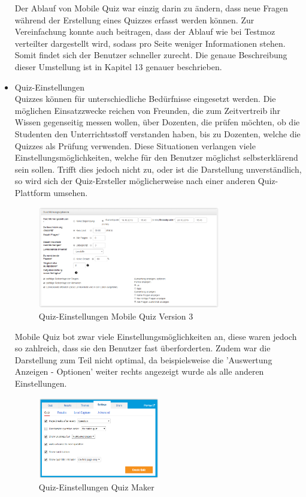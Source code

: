 \begin{itemize}
		Der Ablauf von Mobile Quiz war einzig darin zu ändern, dass neue Fragen während der Erstellung eines Quizzes erfasst werden können. Zur Vereinfachung konnte auch beitragen, dass der Ablauf wie bei Testmoz \cite{testmoz.com} verteilter dargestellt wird, sodass pro Seite weniger Informationen stehen. Somit findet sich der Benutzer schneller zurecht. Die genaue Beschreibung dieser Umstellung ist in Kapitel 13 genauer beschrieben. 
		
		
		
		
		\item  Quiz-Einstellungen \\
		Quizzes können für unterschiedliche Bedürfnisse eingesetzt werden. Die möglichen Einsatzzwecke reichen von Freunden, die zum Zeitvertreib ihr Wissen gegenseitig messen wollen, über Dozenten, die prüfen möchten, ob die Studenten den Unterrichtsstoff verstanden haben, bis zu Dozenten, welche die Quizzes als Prüfung verwenden.
		Diese Situationen verlangen viele Einstellungsmöglichkeiten, welche für den Benutzer möglichst selbsterklärend sein sollen. Trifft dies jedoch nicht zu, oder ist die Darstellung unverständlich, so wird sich der Quiz-Ersteller möglicherweise nach einer anderen Quiz-Plattform umsehen.
		
		\begin{figure}[H]
			\centering
			\includegraphics[width=0.75\textwidth
			]{Images/MobileQuiz_Quiz-Settings.PNG}
			\caption{Quiz-Einstellungen Mobile Quiz Version 3}
		\end{figure}
		
		
		Mobile Quiz bot zwar viele Einstellungsmöglichkeiten an, diese waren jedoch so zahlreich, dass sie den Benutzer fast überforderten. Zudem war die Darstellung zum Teil nicht optimal, da beispielsweise die 'Auswertung Anzeigen - Optionen' weiter rechts angezeigt wurde als alle anderen Einstellungen.
		
		\begin{figure}[H]
			\centering
			\includegraphics[width=0.5\textwidth
			]{Images/QuizMaker_Quiz-Settings.PNG}
			\caption{Quiz-Einstellungen Quiz Maker}
		\end{figure}
		

\end{itemize}
